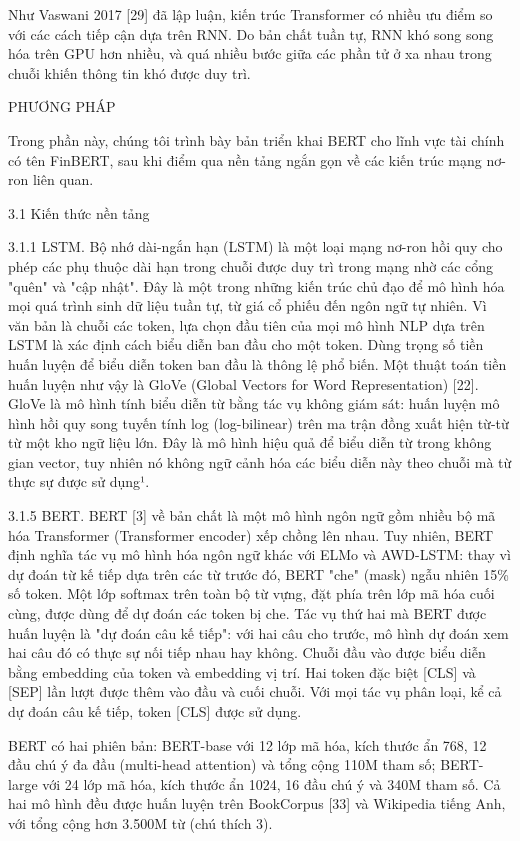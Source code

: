 Như Vaswani 2017 {[}29{]} đã lập luận, kiến trúc Transformer có nhiều ưu điểm so với các cách tiếp cận dựa trên RNN. Do bản chất tuần tự, RNN khó song song hóa trên GPU hơn nhiều, và quá nhiều bước giữa các phần tử ở xa nhau trong chuỗi khiến thông tin khó được duy trì.

PHƯƠNG PHÁP

Trong phần này, chúng tôi trình bày bản triển khai BERT cho lĩnh vực tài chính có tên FinBERT, sau khi điểm qua nền tảng ngắn gọn về các kiến trúc mạng nơ-ron liên quan.

3.1 Kiến thức nền tảng

3.1.1 LSTM. Bộ nhớ dài-ngắn hạn (LSTM) là một loại mạng nơ-ron hồi quy cho phép các phụ thuộc dài hạn trong chuỗi được duy trì trong mạng nhờ các cổng "quên" và "cập nhật". Đây là một trong những kiến trúc chủ đạo để mô hình hóa mọi quá trình sinh dữ liệu tuần tự, từ giá cổ phiếu đến ngôn ngữ tự nhiên. Vì văn bản là chuỗi các token, lựa chọn đầu tiên của mọi mô hình NLP dựa trên LSTM là xác định cách biểu diễn ban đầu cho một token. Dùng trọng số tiền huấn luyện để biểu diễn token ban đầu là thông lệ phổ biến. Một thuật toán tiền huấn luyện như vậy là GloVe (Global Vectors for Word Representation) {[}22{]}. GloVe là mô hình tính biểu diễn từ bằng tác vụ không giám sát: huấn luyện mô hình hồi quy song tuyến tính log (log-bilinear) trên ma trận đồng xuất hiện từ-từ từ một kho ngữ liệu lớn. Đây là mô hình hiệu quả để biểu diễn từ trong không gian vector, tuy nhiên nó không ngữ cảnh hóa các biểu diễn này theo chuỗi mà từ thực sự được sử dụng¹.

3.1.5 BERT. BERT {[}3{]} về bản chất là một mô hình ngôn ngữ gồm nhiều bộ mã hóa Transformer (Transformer encoder) xếp chồng lên nhau. Tuy nhiên, BERT định nghĩa tác vụ mô hình hóa ngôn ngữ khác với ELMo và AWD-LSTM: thay vì dự đoán từ kế tiếp dựa trên các từ trước đó, BERT "che" (mask) ngẫu nhiên 15\% số token. Một lớp softmax trên toàn bộ từ vựng, đặt phía trên lớp mã hóa cuối cùng, được dùng để dự đoán các token bị che. Tác vụ thứ hai mà BERT được huấn luyện là "dự đoán câu kế tiếp": với hai câu cho trước, mô hình dự đoán xem hai câu đó có thực sự nối tiếp nhau hay không. Chuỗi đầu vào được biểu diễn bằng embedding của token và embedding vị trí. Hai token đặc biệt {[}CLS{]} và {[}SEP{]} lần lượt được thêm vào đầu và cuối chuỗi. Với mọi tác vụ phân loại, kể cả dự đoán câu kế tiếp, token {[}CLS{]} được sử dụng.

BERT có hai phiên bản: BERT-base với 12 lớp mã hóa, kích thước ẩn 768, 12 đầu chú ý đa đầu (multi-head attention) và tổng cộng 110M tham số; BERT-large với 24 lớp mã hóa, kích thước ẩn 1024, 16 đầu chú ý và 340M tham số. Cả hai mô hình đều được huấn luyện trên BookCorpus {[}33{]} và Wikipedia tiếng Anh, với tổng cộng hơn 3.500M từ (chú thích 3).

